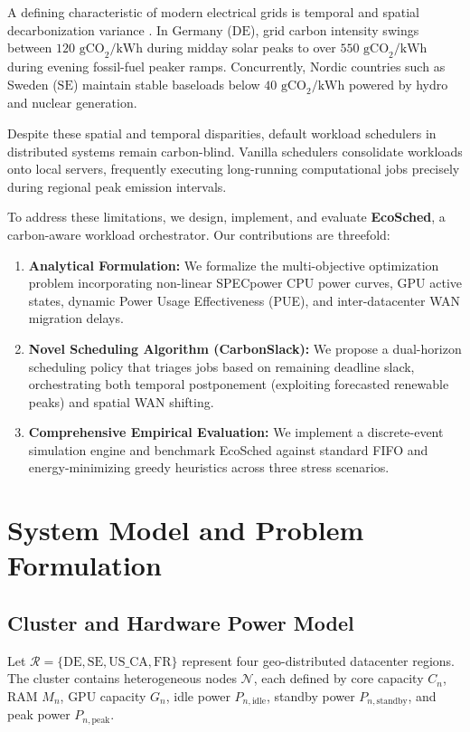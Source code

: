\documentclass[conference]{IEEEtran}
\begin{document}
A defining characteristic of modern electrical grids is temporal and spatial decarbonization variance \cite{entsoe2024transparency}. In Germany ($\text{DE}$), grid carbon intensity swings between $120\text{ gCO}_2/\text{kWh}$ during midday solar peaks to over $550\text{ gCO}_2/\text{kWh}$ during evening fossil-fuel peaker ramps. Concurrently, Nordic countries such as Sweden ($\text{SE}$) maintain stable baseloads below $40\text{ gCO}_2/\text{kWh}$ powered by hydro and nuclear generation. 

Despite these spatial and temporal disparities, default workload schedulers in distributed systems remain carbon-blind. Vanilla schedulers consolidate workloads onto local servers, frequently executing long-running computational jobs precisely during regional peak emission intervals.

To address these limitations, we design, implement, and evaluate \textbf{EcoSched}, a carbon-aware workload orchestrator. Our contributions are threefold:
\begin{enumerate}
    \item \textbf{Analytical Formulation:} We formalize the multi-objective optimization problem incorporating non-linear SPECpower CPU power curves, GPU active states, dynamic Power Usage Effectiveness (PUE), and inter-datacenter WAN migration delays.
    \item \textbf{Novel Scheduling Algorithm (CarbonSlack):} We propose a dual-horizon scheduling policy that triages jobs based on remaining deadline slack, orchestrating both temporal postponement (exploiting forecasted renewable peaks) and spatial WAN shifting.
    \item \textbf{Comprehensive Empirical Evaluation:} We implement a discrete-event simulation engine and benchmark EcoSched against standard FIFO and energy-minimizing greedy heuristics across three stress scenarios.
\end{enumerate}

\section{System Model and Problem Formulation}

\subsection{Cluster and Hardware Power Model}
Let $\mathcal{R} = \{\text{DE}, \text{SE}, \text{US\_CA}, \text{FR}\}$ represent four geo-distributed datacenter regions. The cluster contains heterogeneous nodes $\mathcal{N}$, each defined by core capacity $C_n$, RAM $M_n$, GPU capacity $G_n$, idle power $P_{n,\text{idle}}$, standby power $P_{n,\text{standby}}$, and peak power $P_{n,\text{peak}}$.
\end{document}

